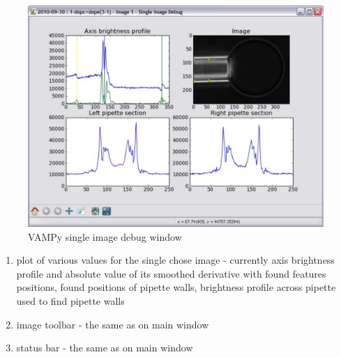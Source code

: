 \begin{itemize}
\begin{figure}[htbp]
			\centering
			\includegraphics[width=1.00\textwidth]{figs/vampydebug.pdf}
			\caption{VAMPy single image debug window}
			\label{fig:vampydebug}
		\end{figure}
		\begin{enumerate}
			\item plot of various values for the single chose image - currently axis brightness profile and absolute value of its smoothed derivative with found features positions, found positions of pipette walls, brightness profile across pipette used to find pipette walls
			\item image toolbar - the same as on main window
			\item status bar - the same as on main window
		\end{enumerate}
\end{itemize}

